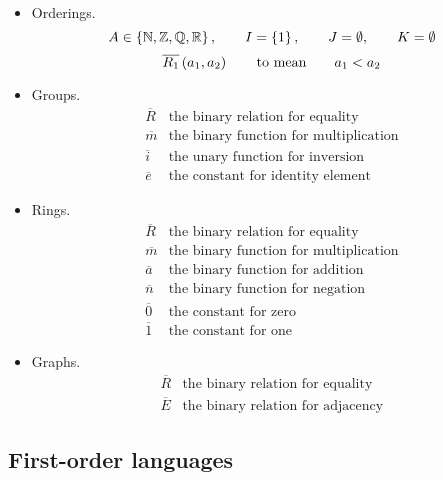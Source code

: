 \pagebreak

\begin{example}
\label{eg:2.1.3}
\hfill
\begin{itemize}
\item Orderings.
$$ A \in \cbr{\N, \Z, \Q, \R}, \qquad I = \cbr{1}, \qquad J = \emptyset, \qquad K = \emptyset $$
$$ \overline{R_1}\br{a_1, a_2} \qquad \text{to mean} \qquad a_1 < a_2 $$
\item Groups.
$$
\begin{array}{ll}
\overline{R} & \text{the binary relation for equality} \\
\overline{m} & \text{the binary function for multiplication} \\
\overline{i} & \text{the unary function for inversion} \\
\overline{e} & \text{the constant for identity element}
\end{array}
$$
\item Rings.
$$
\begin{array}{ll}
\overline{R} & \text{the binary relation for equality} \\
\overline{m} & \text{the binary function for multiplication} \\
\overline{a} & \text{the binary function for addition} \\
\overline{n} & \text{the binary function for negation} \\
\overline{0} & \text{the constant for zero} \\
\overline{1} & \text{the constant for one}
\end{array}
$$
\item Graphs.
$$
\begin{array}{ll}
\overline{R} & \text{the binary relation for equality} \\
\overline{E} & \text{the binary relation for adjacency}
\end{array}
$$
\end{itemize}
\end{example}

\subsection{First-order languages}

